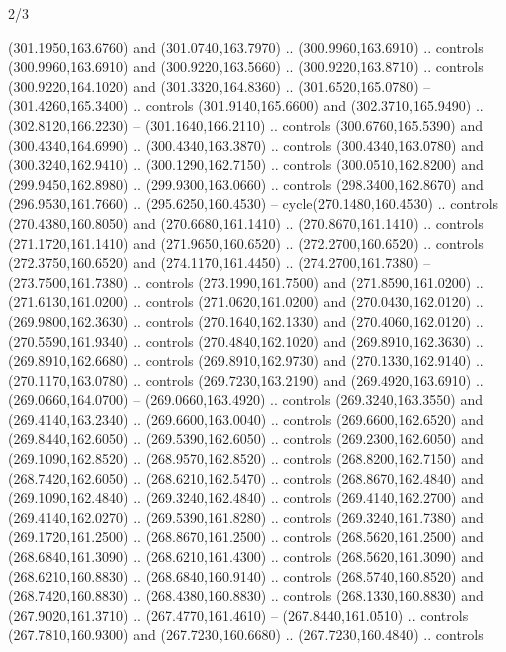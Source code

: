 \begin{flagdescription}{2/3}
\begin{scope}[xshift=0.5\flaglength,yshift=0.5\flagwidth,scale=\flagwidth/259.2]
\begin{scope}[y=0.8pt, x=0.8pt, yscale=-1,shift={(-243,-162)}]
      (301.1950,163.6760) and (301.0740,163.7970) .. (300.9960,163.6910) .. controls
      (300.9960,163.6910) and (300.9220,163.5660) .. (300.9220,163.8710) .. controls
      (300.9220,164.1020) and (301.3320,164.8360) .. (301.6520,165.0780) --
      (301.4260,165.3400) .. controls (301.9140,165.6600) and (302.3710,165.9490) ..
      (302.8120,166.2230) -- (301.1640,166.2110) .. controls (300.6760,165.5390) and
      (300.4340,164.6990) .. (300.4340,163.3870) .. controls (300.4340,163.0780) and
      (300.3240,162.9410) .. (300.1290,162.7150) .. controls (300.0510,162.8200) and
      (299.9450,162.8980) .. (299.9300,163.0660) .. controls (298.3400,162.8670) and
      (296.9530,161.7660) .. (295.6250,160.4530) -- cycle(270.1480,160.4530) ..
      controls (270.4380,160.8050) and (270.6680,161.1410) .. (270.8670,161.1410) ..
      controls (271.1720,161.1410) and (271.9650,160.6520) .. (272.2700,160.6520) ..
      controls (272.3750,160.6520) and (274.1170,161.4450) .. (274.2700,161.7380) --
      (273.7500,161.7380) .. controls (273.1990,161.7500) and (271.8590,161.0200) ..
      (271.6130,161.0200) .. controls (271.0620,161.0200) and (270.0430,162.0120) ..
      (269.9800,162.3630) .. controls (270.1640,162.1330) and (270.4060,162.0120) ..
      (270.5590,161.9340) .. controls (270.4840,162.1020) and (269.8910,162.3630) ..
      (269.8910,162.6680) .. controls (269.8910,162.9730) and (270.1330,162.9140) ..
      (270.1170,163.0780) .. controls (269.7230,163.2190) and (269.4920,163.6910) ..
      (269.0660,164.0700) -- (269.0660,163.4920) .. controls (269.3240,163.3550) and
      (269.4140,163.2340) .. (269.6600,163.0040) .. controls (269.6600,162.6520) and
      (269.8440,162.6050) .. (269.5390,162.6050) .. controls (269.2300,162.6050) and
      (269.1090,162.8520) .. (268.9570,162.8520) .. controls (268.8200,162.7150) and
      (268.7420,162.6050) .. (268.6210,162.5470) .. controls (268.8670,162.4840) and
      (269.1090,162.4840) .. (269.3240,162.4840) .. controls (269.4140,162.2700) and
      (269.4140,162.0270) .. (269.5390,161.8280) .. controls (269.3240,161.7380) and
      (269.1720,161.2500) .. (268.8670,161.2500) .. controls (268.5620,161.2500) and
      (268.6840,161.3090) .. (268.6210,161.4300) .. controls (268.5620,161.3090) and
      (268.6210,160.8830) .. (268.6840,160.9140) .. controls (268.5740,160.8520) and
      (268.7420,160.8830) .. (268.4380,160.8830) .. controls (268.1330,160.8830) and
      (267.9020,161.3710) .. (267.4770,161.4610) -- (267.8440,161.0510) .. controls
      (267.7810,160.9300) and (267.7230,160.6680) .. (267.7230,160.4840) .. controls

\end{scope}
\end{scope}
\end{flagdescription}
